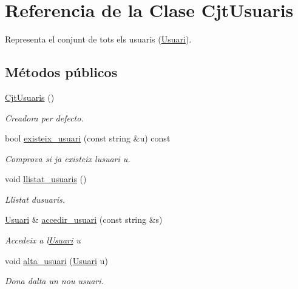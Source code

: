 \hypertarget{class_cjt_usuaris}{}\section{Referencia de la Clase Cjt\+Usuaris}
\label{class_cjt_usuaris}


Representa el conjunt de tots els usuaris (\mbox{\hyperlink{class_usuari}{Usuari}}). 


\subsection*{Métodos públicos}
\begin{DoxyCompactItemize}
\item 
\mbox{\hyperlink{class_cjt_usuaris_a66bec1ef851247d1729414abcfcba4a6}{Cjt\+Usuaris}} ()
\begin{DoxyCompactList}\small\item\em Creadora per defecto. \end{DoxyCompactList}\item 
bool \mbox{\hyperlink{class_cjt_usuaris_a0d3f318f95ecfdae0f7420113cc73ab0}{existeix\+\_\+usuari}} (const string \&u) const
\begin{DoxyCompactList}\small\item\em Comprova si ja existeix l\textquotesingle{}usuari u. \end{DoxyCompactList}\item 
void \mbox{\hyperlink{class_cjt_usuaris_a28020e6e834b3c483198285fb35436fc}{llistat\+\_\+usuaris}} ()
\begin{DoxyCompactList}\small\item\em Llistat d\textquotesingle{}usuaris. \end{DoxyCompactList}\item 
\mbox{\hyperlink{class_usuari}{Usuari}} \& \mbox{\hyperlink{class_cjt_usuaris_a01e702bce964b2a96af36fcd9a820b74}{accedir\+\_\+usuari}} (const string \&s)
\begin{DoxyCompactList}\small\item\em Accedeix a l\textquotesingle{}\mbox{\hyperlink{class_usuari}{Usuari}} {\itshape u} \end{DoxyCompactList}\item 
void \mbox{\hyperlink{class_cjt_usuaris_a40b8eb64e9dc22e3cf0ee38d52d48e20}{alta\+\_\+usuari}} (\mbox{\hyperlink{class_usuari}{Usuari}} u)
\begin{DoxyCompactList}\small\item\em Dona d\textquotesingle{}alta un nou usuari. \end{DoxyCompactList}\item 

\end{DoxyCompactItemize}
